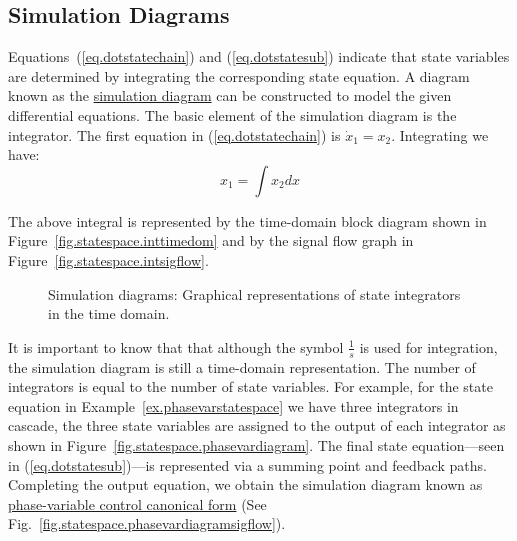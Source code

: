 \subsection{Simulation Diagrams}

Equations~(\ref{eq.dotstatechain}) and (\ref{eq.dotstatesub}) indicate that state variables are determined by integrating the corresponding state equation.  A diagram known as the \uline{simulation diagram} can be constructed to model the given differential equations.  The basic element of the simulation diagram is the integrator.  The first equation in (\ref{eq.dotstatechain}) is $\dot{x}_1  = x_2$.  Integrating we have:
\begin{equation*}
    x_1 = \int x_2 dx
\end{equation*}
\par
The above integral is represented by the time-domain block diagram shown in Figure~\ref{fig.statespace.inttimedom} and by the signal flow graph in Figure~\ref{fig.statespace.intsigflow}.

\newsavebox{\tempbig}
\newsavebox{\tempsmall}
\begin{figure}[bht]
\centering
{}
\newlength{\subfigoffset}
\setlength{\subfigoffset}{.5\ht\tempbig}
\addtolength{\subfigoffset}{-.5\ht\tempsmall}
\hfill
{}
\caption{\footnotesize
        Simulation diagrams: Graphical representations of state integrators in the time domain.
        \label{fig.statespace.integratorgraphs}
        }
\end{figure}
\par

It is important to know that that although the symbol $\frac{1}{s}$ is used for integration, the simulation diagram is still a time-domain representation.  The number of integrators is equal to the number of state variables.  For example, for the state equation in Example~\ref{ex.phasevarstatespace} we have three integrators in cascade, the three state variables are assigned to the output of each integrator as shown in Figure~\ref{fig.statespace.phasevardiagram}.  The final state equation---seen in (\ref{eq.dotstatesub})---is represented via a summing point and feedback paths.  Completing the output equation, we obtain the simulation diagram known as \uline{phase-variable control canonical form} (See Fig.\ \ref{fig.statespace.phasevardiagramsigflow}).

